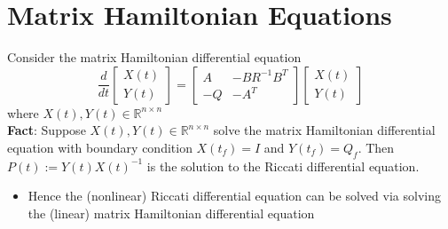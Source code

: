 \documentclass[10pt,a4paper,oneside]{article}
\begin{document}
\section{Matrix Hamiltonian Equations}
Consider the matrix Hamiltonian differential equation
$$
\frac{d}{d t}\left[\begin{array}{l}{X(t)} \\ {Y(t)}\end{array}\right]=\left[\begin{array}{cc}{A} & {-B R^{-1} B^{T}} \\ {-Q} & {-A^{T}}\end{array}\right]\left[\begin{array}{l}{X(t)} \\ {Y(t)}\end{array}\right]
$$
where $X(t),Y(t)\in\mathbb{R}^{n\times n}$\\
{\bfseries Fact}: Suppose $X(t),Y(t)\in\mathbb{R}^{n\times n}$ solve the matrix Hamiltonian differential equation with boundary condition $X(t_f)=I$ and $Y(t_f)=Q_f$. Then $
P(t) :=Y(t) X(t)^{-1}
$ is the solution to the Riccati differential equation.
\begin{itemize}
\item Hence the (nonlinear) Riccati differential equation can be solved via solving the (linear) matrix Hamiltonian differential equation
\end{itemize}
\end{document}
